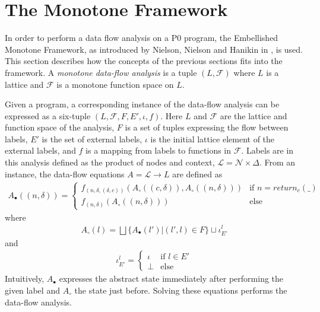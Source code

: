 \section{The Monotone Framework}
\label{sec:framework}
In order to perform a data flow analysis on a P0 program, the Embellished Monotone Framework, as introduced by Nielson, Nielson and Hanikin in , is used. This section describes how the concepts of the previous sections fits into the framework. A \emph{monotone data-flow analysis} is a tuple $(L, \mathcal{F})$ where $L$ is a lattice and $\mathcal{F}$ is a monotone function space on $L$.

Given a program, a corresponding instance of the data-flow analysis can be expressed as a six-tuple $(L, \mathcal{F}, F, E', \iota, f)$. Here $L$ and $\mathcal{F}$ are the lattice and function space of the analysis, $F$ is a set of tuples expressing the flow between labels, $E'$ is the set of external labels, $\iota$ is the initial lattice element of the external labels, and $f$ is a mapping from labels to functions in $\mathcal{F}$. Labels are in this analysis defined as the product of nodes and context, $\mathcal{L} = \mathcal{N}\times \Delta$. From an instance, the data-flow equations $A = \mathcal{L} \rightarrow L$ are defined as
\begin{align}
	A_\bullet ((n, \delta)) = \begin{cases} 
		f_{(n, \delta, (\delta, c))}(A_\circ(( c, \delta)), A_\circ((n, \delta))) &\text{if $n=\mathit{return}_c(\_)$}\\
		f_{(n, \delta)}(A_\circ((n, \delta)))& \text{else}
		\end{cases}
\end{align}
where 
\begin{align}
	A_\circ (l) = \bigsqcup \{A_\bullet(l') | (l', l) \in F\} \sqcup \iota_{E'}^l
\end{align}
and
\begin{align}
\iota_{E'}^l = \begin{cases} \iota & \text{if }l\in E' \\  \bot &\text{else} \end{cases}
\end{align}
Intuitively, $A_\bullet$ expresses the abstract state immediately after performing the given label and $A_\circ$ the state just before. Solving these equations performs the data-flow analysis. 

